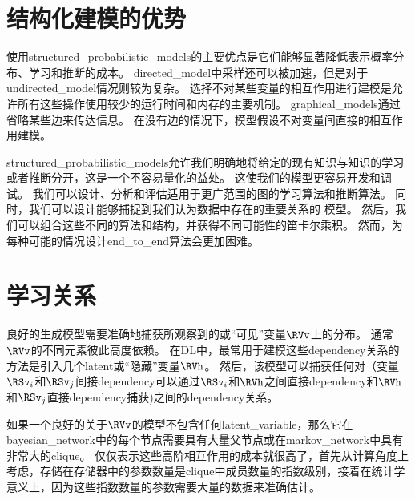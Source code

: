 \section{结构化建模的优势}
\label{sec:advantages_of_structured_modelling}


使用\gls{structured_probabilistic_models}的主要优点是它们能够显著降低表示概率分布、学习和推断的成本。
\gls{directed_model}中采样还可以被加速，但是对于\gls{undirected_model}情况则较为复杂。
选择不对某些变量的相互作用进行建模是允许所有这些操作使用较少的运行时间和内存的主要机制。
\gls{graphical_models}通过省略某些边来传达信息。
在没有边的情况下，模型假设不对变量间直接的相互作用建模。


\gls{structured_probabilistic_models}允许我们明确地将给定的现有知识与知识的学习或者推断分开，这是一个不容易量化的益处。
这使我们的模型更容易开发和调试。 
我们可以设计、分析和评估适用于更广范围的图的学习算法和推断算法。
同时，我们可以设计能够捕捉到我们认为数据中存在的重要关系的
模型。
然后，我们可以组合这些不同的算法和结构，并获得不同可能性的笛卡尔乘积。
然而，为每种可能的情况设计\gls{end_to_end}算法会更加困难。



\section{学习关系}
\label{sec:learning_about_dependencies}

良好的生成模型需要准确地捕获所观察到的或``可见''变量$\RVv$上的分布。
通常$\RVv$的不同元素彼此高度依赖。
在\gls{DL}中，最常用于建模这些\gls{dependency}关系的方法是引入几个\gls{latent}或``隐藏''变量$\RVh$。
然后，该模型可以捕获任何对（变量$\RSv_i$和$\RSv_j$间接\gls{dependency}可以通过$\RSv_i$和$\RVh$之间直接\gls{dependency}和$\RVh$和$\RSv_j$直接\gls{dependency}捕获)之间的\gls{dependency}关系。%


如果一个良好的关于$\RVv$的模型不包含任何\gls{latent_variable}，那么它在\gls{bayesian_network}中的每个节点需要具有大量父节点或在\gls{markov_network}中具有非常大的\gls{clique}。
仅仅表示这些高阶相互作用的成本就很高了，首先从计算角度上考虑，存储在存储器中的参数数量是\gls{clique}中成员数量的指数级别，接着在统计学意义上，因为这些指数数量的参数需要大量的数据来准确估计。


